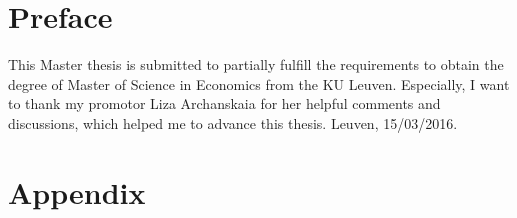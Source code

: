 \documentclass[11pt,leqno,a4paper]{scrbook}
\begin{document}
\setcounter{tocdepth}{1}



\setcounter{equation}{1}
\pagestyle{empty}

\clearpage

\chapter*{Preface\hfill} 

\begin{flushright}
This Master thesis  is submitted to partially fulfill the requirements to obtain the degree of Master of Science in
Economics from the KU Leuven. Especially,  I want to thank my promotor Liza Archanskaia for her helpful comments and discussions, which helped me to advance this thesis. %
Leuven, 15/03/2016.
\end{flushright}


\mainmatter

\pagestyle{headings}


%



%


\clearpage
\printbibliography
\vfill
\pagestyle{empty}
\appendix
{}


\tocless \chapter{Appendix}

\clearpage
\newpage
\thispagestyle{empty}

\end{document}
